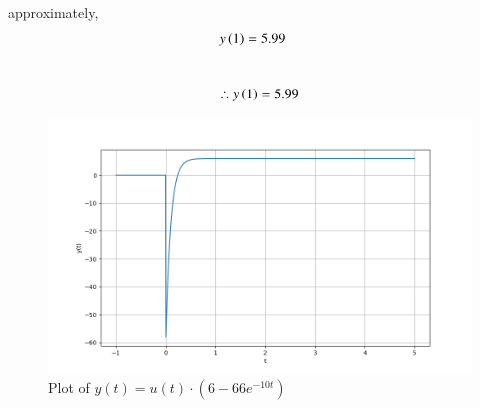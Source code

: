 \documentclass[journal,12pt,twocolumn]{IEEEtran}
\theoremstyle{remark}
\begin{document}
    approximately,
    \begin{align}
        y\left(1\right) &=5.99
    \end{align}
    \\
    $$\therefore  y\left(1\right)=5.99$$
    \begin{figure}[h]
    \centering  

\includegraphics[width=\columnwidth]{fig/plot.png}

    \centering
    \caption{Plot of $y(t) = u(t) \cdot (6 - 66e^{-10t})$}

    \label{fig:}
\end{figure}
\end{document}
